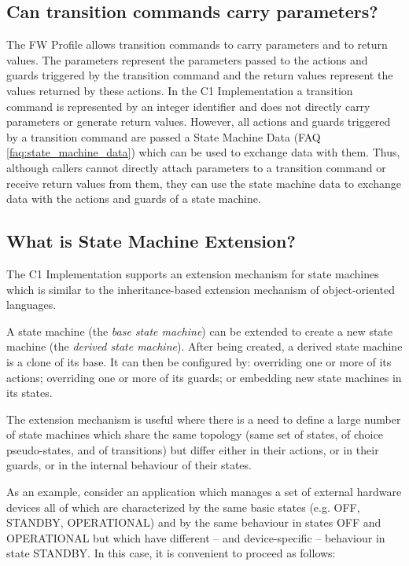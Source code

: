 \documentclass[a4paper,10pt]{article}
\begin{document}
\subsection{Can transition commands carry parameters?}
The FW Profile allows transition commands to carry parameters and to return values. The parameters represent the parameters passed to the actions 
and guards triggered by the transition command and the return values represent the values returned by these actions. In the C1 Implementation 
a transition command is represented by an integer identifier and does not directly carry parameters or generate return values. However, all actions 
and guards triggered by a transition command are passed a State Machine Data (FAQ \ref{faq:state_machine_data}) which can be used to exchange data with them. 
Thus, although callers cannot directly attach parameters to a transition command or receive return values from them, they can use the state machine 
data to exchange data with the actions and guards of a state machine.

\subsection{What is State Machine Extension?}\label{faq:SM_Extension}
The C1 Implementation supports an extension mechanism for state machines which is similar to the inheritance-based extension mechanism of object-oriented languages.

A state machine (the \emph{base state machine}) can be extended to create a new state machine (the \emph{derived state machine}). After being created, 
a derived state machine is a clone of its base. It can then be configured by: overriding one or more of its actions; overriding one or more of its guards; 
or embedding new state machines in its states.

The extension mechanism is useful where there is a need to define a large number of state machines which share the same topology (same set of states, 
of choice pseudo-states, and of transitions) but differ either in their actions, or in their guards, or in the internal behaviour of their states.

As an example, consider an application which manages a set of external hardware devices all of which are characterized by the same basic 
states (e.g. OFF, STANDBY, OPERATIONAL) and by the same behaviour in states OFF and OPERATIONAL but which have different -- and device-specific -- 
behaviour in state STANDBY. In this case, it is convenient to proceed as follows:
\end{document}
